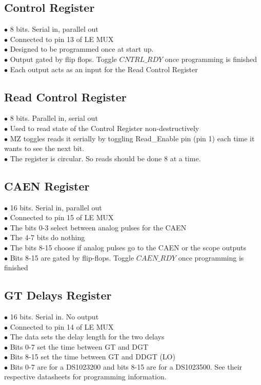 \documentclass[11pt,a4paper]{article}
\begin{document}
\subsection{Control Register}
$\bullet$ 8 bits. Serial in, parallel out\\
$\bullet$ Connected to pin 13 of LE MUX\\
$\bullet$ Designed to be programmed once at start up.\\
$\bullet$ Output gated by flip flops. Toggle $CNTRL\_RDY$ once programming is finished\\
$\bullet$ Each output acts as an input for the Read Control Register\\
\subsection{Read Control Register}
$\bullet$ 8 bits. Parallel in, serial out \\
$\bullet$ Used to read state of the Control Register non-destructively \\
$\bullet$ MZ toggles reads it serially by toggling Read\_Enable pin (pin 1) each time it wants to see the next bit.\\
$\bullet$ The register is circular. So reads should be done 8 at a time.\\
\subsection{CAEN Register}
$\bullet$ 16 bits. Serial in, parallel out\\
$\bullet$ Connected to pin 15 of LE MUX \\
$\bullet$ The bits 0-3 select between analog pulses for the CAEN\\
$\bullet$ The 4-7 bits do nothing\\
$\bullet$ The bits 8-15 choose if analog pulses go to the CAEN or the scope outputs\\
$\bullet$ Bits 8-15 are gated by flip-flops. Toggle $CAEN\_RDY$ once programming is finished\\
\subsection{GT Delays Register}
$\bullet$ 16 bits. Serial in. No output\\
$\bullet$ Connected to pin 14 of LE MUX\\
$\bullet$ The data sets the delay length for the two delays\\
$\bullet$ Bits 0-7 set the time between GT and DGT\\
$\bullet$ Bits 8-15 set the time between GT and DDGT (LO)\\
$\bullet$ Bits 0-7 are for a DS1023200 and bits 8-15 are for a DS1023500. See their respective datasheets for programming information.\\
\end{document}
